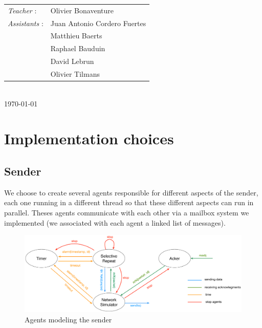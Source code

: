 \documentclass[10pt,a4paper]{article}
\begin{document}
\begin{titlepage}
\normalsize
{\begin{tabular}{ll}
\textit{Teacher} : & Olivier Bonaventure\\
\textit{Assistants} : & Juan Antonio Cordero Fuertes\\
& Matthieu Baerts\\
& Raphael Bauduin\\
& David Lebrun\\
& Olivier Tilmans
\end{tabular}}
\\[1cm]


{\normalsize \today} %

\newpage

\end{titlepage}

%


\section{Implementation choices}

\subsection{Sender}

We choose to create several agents responsible for different aspects of the sender, each one running in a different thread so that these different aspects can run in parallel. Theses agents communicate with each other via a mailbox system we implemented (we associated with each agent a linked list of messages).

\begin{figure}[!h]
	\begin{center}
		\includegraphics[width=18cm]{images/sender.eps}
		\caption{Agents modeling the sender}
		\label{sender}
	\end{center}
\end{figure}
\end{document}
